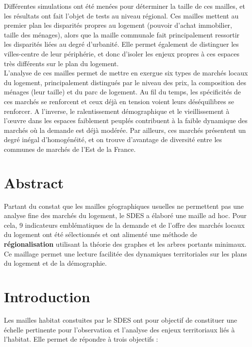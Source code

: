 \documentclass[12pt, a4paper]{article}
\begin{document}
Différentes simulations ont été menées pour déterminer la taille de ces mailles, et les résultats ont fait l'objet de tests au niveau régional. Ces mailles mettent au premier plan les disparités propres au logement (pouvoir d'achat immobilier, taille des ménages), alors que la maille communale fait principalement ressortir les disparités liées au degré d'urbanité. Elle permet également de distinguer les villes-centre de leur périphérie, et donc d'isoler les enjeux propres à ces espaces très différents sur le plan du logement. \\

L'analyse de ces mailles permet de mettre en exergue six types de marchés locaux du logement, principalement distingués par le niveau des prix, la composition des ménages (leur taille) et du parc de logement. Au fil du temps, les spécificités de ces marchés se renforcent et ceux déjà en tension voient leurs déséquilibres se renforcer. A l'inverse, le ralentissement démographique et le vieillissement à l'\oe uvre dans les espaces faiblement peuplés contribuent à la faible dynamique des marchés où la demande est déjà modérée. Par ailleurs, ces marchés présentent un degré inégal d'homogénéité, et on trouve d'avantage de diversité entre les communes de marchés de l'Est de la France.

\section*{Abstract}

Partant du constat que les mailles géographiques usuelles ne permettent pas une analyse fine des marchés du logement, le SDES a élaboré une maille ad hoc. Pour cela, 9 indicateurs emblématiques de la demande et de l'offre des marchés locaux du logement ont été sélectionnés et ont alimenté une méthode de \textbf{régionalisation} utilisant la théorie des graphes et les arbres portants minimaux. Ce maillage permet une lecture facilitée des dynamiques territoriales sur les plans du logement et de la démographie.


\section*{Introduction}

Les mailles habitat constuites par le SDES ont pour objectif de constituer une échelle pertinente pour l'observation et l'analyse des enjeux territoriaux liés à l'habitat. Elle permet de répondre à trois objectifs :
\end{document}

